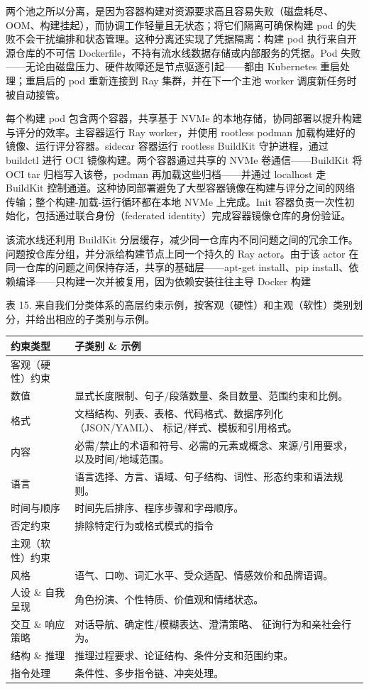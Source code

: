 \documentclass[
  10
]{article}
\newcounter{none} %
\begin{document}
两个池之所以分离，是因为容器构建对资源要求高且容易失败（磁盘耗尽、OOM、构建挂起），而协调工作轻量且无状态；将它们隔离可确保构建 pod 的失败不会干扰编排和状态管理。这种分离还实现了凭据隔离：构建 pod 执行来自开源仓库的不可信 Dockerfile，不持有流水线数据存储或内部服务的凭据。Pod 失败——无论由磁盘压力、硬件故障还是节点驱逐引起——都由 Kubernetes 重启处理；重启后的 pod 重新连接到 Ray 集群，并在下一个主池 worker 调度新任务时被自动接管。

每个构建 pod 包含两个容器，共享基于 NVMe 的本地存储，协同部署以提升构建与评分的效率。主容器运行 Ray worker，并使用 rootless podman 加载构建好的镜像、运行评分容器。sidecar 容器运行 rootless BuildKit 守护进程，通过 buildctl 进行 OCI 镜像构建。两个容器通过共享的 NVMe 卷通信——BuildKit 将 OCI tar 归档写入该卷，podman 再加载这些归档——并通过 localhost 走 BuildKit 控制通道。这种协同部署避免了大型容器镜像在构建与评分之间的网络传输；整个构建-加载-运行循环都在本地 NVMe 上完成。Init 容器负责一次性初始化，包括通过联合身份（federated identity）完成容器镜像仓库的身份验证。

该流水线还利用 BuildKit 分层缓存，减少同一仓库内不同问题之间的冗余工作。问题按仓库分组，并分派给构建节点上同一个持久的 Ray actor。由于该 actor 在同一仓库的问题之间保持存活，共享的基础层——apt-get install、pip install、依赖编译——只构建一次并被复用，因为依赖安装往往主导 Docker 构建



表 15. 来自我们分类体系的高层约束示例，按客观（硬性）和主观（软性）类别划分，并给出相应的子类别与示例。

{\def\LTcaptype{none} %
\begin{longtable}[]{@{}|l|l|@{}}
\toprule\noalign{}
\endhead
\bottomrule\noalign{}
\endlastfoot
\hline
约束类型 & 子类别 \& 示例 \\
\hline
客观（硬性）约束 & \\
\hline
数值 & 显式长度限制、句子/段落数量、条目数量、范围约束和比例。 \\
\hline
格式 & 文档结构、列表、表格、代码格式、数据序列化（JSON/YAML）、
标记/样式、模板和引用格式。 \\
\hline
内容 & 必需/禁止的术语和符号、必需的元素或概念、来源/引用要求，
以及时间/地域范围。 \\
\hline
语言 & 语言选择、方言、语域、句子结构、词性、形态约束和语法规则。 \\
\hline
时间与顺序 & 时间先后排序、程序步骤和字母顺序。 \\
\hline
否定约束 & 排除特定行为或格式模式的指令 \\
\hline
主观（软性）约束 & \\
\hline
风格 & 语气、口吻、词汇水平、受众适配、情感效价和品牌语调。 \\
\hline
人设 \& 自我呈现 & 角色扮演、个性特质、价值观和情绪状态。 \\
\hline
交互 \& 响应策略 & 对话导航、确定性/模糊表达、澄清策略、
征询行为和亲社会行为。 \\
\hline
结构 \& 推理 & 推理过程要求、论证结构、条件分支和范围约束。 \\
\hline
指令处理 & 条件性、多步指令链、冲突处理。 \\
\hline
\end{longtable}
}
\end{document}
